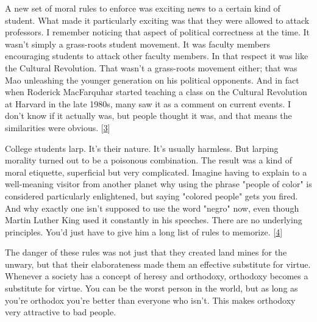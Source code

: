 A new set of moral
                  rules to enforce was exciting news to a certain kind of
                  student. What made it particularly exciting was that they were
                  allowed to attack professors. I remember noticing that aspect
                  of political correctness at the time. It wasn't simply a
                  grass-roots student movement. It was faculty members
                  encouraging students to attack other faculty members. In that
                  respect it was like the Cultural Revolution. That wasn't a
                  grass-roots movement either; that was Mao unleashing the
                  younger generation on his political opponents. And in fact
                  when Roderick MacFarquhar started teaching a class on the
                  Cultural Revolution at Harvard in the late 1980s, many saw it
                  as a comment on current events. I don't know if it actually
                  was, but people thought it was, and that means the
                  similarities were obvious.
                  [\href{\#f3n}{3}]

College students larp. It's their nature. It's
                  usually harmless. But larping morality turned out to be a
                  poisonous combination. The result was a kind of moral
                  etiquette, superficial but very complicated. Imagine having to
                  explain to a well-meaning visitor from another planet why
                  using the phrase "people of color" is considered particularly
                  enlightened, but saying "colored people" gets you fired. And
                  why exactly one isn't supposed to use the word "negro" now,
                  even though Martin Luther King used it constantly in his
                  speeches. There are no underlying principles. You'd just have
                  to give him a long list of rules to memorize.
                  [\href{\#f4n}{4}]


                  The danger of these rules was not just that they created land
                  mines for the unwary, but that their elaborateness made them
                  an effective substitute for virtue. Whenever a society has a
                  concept of heresy and orthodoxy, orthodoxy becomes a
                  substitute for virtue. You can be the worst person in the
                  world, but as long as you're orthodox you're better than
                  everyone who isn't. This makes orthodoxy very attractive to
                  bad people.

